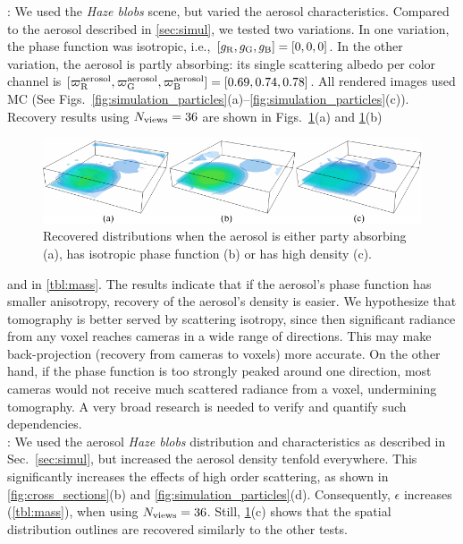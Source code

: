 \documentclass[10pt,letterpaper]{article}
\newcommand{\yoavcomment}[1]{}
\renewcommand{\yoavcomment}[1]{#1} %
\begin{document}
: We used the {\em Haze blobs} scene, but varied the
aerosol characteristics. Compared to the aerosol described in \cref{sec:simul}, we tested two variations. In one variation, the phase function was isotropic, i.e.,
$[g_{\rm R},g_{\rm G},g_{\rm B}]=[0,0,0]$. In the other variation, the aerosol is partly absorbing: its single scattering albedo per color channel is
$[\varpi^{\rm aerosol}_{\rm R},\varpi^{\rm aerosol}_{\rm G},\varpi^{\rm aerosol}_{\rm B}]=
[0.69,0.74,0.78]$.  All rendered images used MC
(See Figs.~\ref{fig:simulation_particles}(a)--\ref{fig:simulation_particles}(c)).
Recovery results using $N_{\rm views}=36$ are shown in Figs.~\ref{fig:reconstructions}(a)
and \ref{fig:reconstructions}(b)
\begin{figure}[b]
  \centering
  \yoavcomment{\includegraphics{images/reconstructions.pdf}}
  \caption{\small  Recovered distributions when the aerosol is either party absorbing (a),
    has isotropic phase function (b) or has high density (c).}
  \label{fig:reconstructions}
\end{figure}
and in \cref{tbl:mass}. The results indicate that if the aerosol's phase function
has smaller anisotropy, recovery of the aerosol's density is easier. We hypothesize that
tomography is better served by scattering isotropy, since then significant radiance from
any voxel reaches cameras in a wide range of directions. This may make back-projection
(recovery from cameras to voxels) more accurate. On the other hand, if the phase function
is too strongly peaked around one direction, most cameras would not receive much scattered
radiance from a voxel, undermining tomography. A very broad research is needed to verify
and quantify such dependencies.\\

: We used the aerosol {\em Haze blobs} distribution
and characteristics as described in Sec.~\ref{sec:simul}, but increased the
aerosol density tenfold everywhere. This significantly increases the effects
of high order scattering, as shown in \cref{fig:cross_sections}(b) and
\cref{fig:simulation_particles}(d). Consequently, $\epsilon$ increases (\cref{tbl:mass}),
when using $N_{\rm views}=36$. Still, \cref{fig:reconstructions}(c) shows
that the spatial distribution outlines are recovered similarly to the other
tests.
\end{document}
